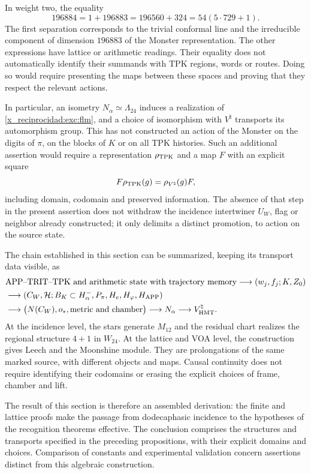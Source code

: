 In weight two, the equality
\[
 196884=1+196883=196560+324=54(5\cdot729+1).
\]
The first separation corresponds to the trivial conformal line and the
irreducible component of dimension $196883$ of the Monster
representation. The other expressions have lattice or
arithmetic readings. Their equality does not automatically identify their summands
with TPK regions, words or routes. Doing so would require
presenting the maps between these spaces and proving that they respect the
relevant actions.

In particular, an isometry $N_\alpha\simeq\Lambda_{24}$ induces
a realization of \eqref{x_reciprocidad:exc:flm}, and a choice of isomorphism
with $V^\natural$ transports its automorphism group. This has not
constructed an action of the Monster on the digits of
$\pi$, on the blocks of $K$ or on all TPK histories.
Such an additional assertion would require a representation
$\rho_{\rm TPK}$ and a map $F$ with an explicit square
\[
 F\rho_{\rm TPK}(g)=\rho_{V^\natural}(g)F,
\]
including domain, codomain and preserved information. The absence
of that step in the present assertion does not withdraw the incidence
intertwiner $U_W$, flag or neighbor already constructed; it only
delimits a distinct promotion, to action on the source state.

The chain established in this section can be summarized, keeping
its transport data visible, as
\begin{align*}
 &\text{APP--TRIT--TPK and arithmetic state with trajectory memory}
   \longrightarrow (w_j,f_j;K,Z_0)\\
 &\longrightarrow (C_W,\mathcal H;B_K\subset H^-_\alpha,
                   P_\pi,H_e,H_\varphi,H_{\rm APP})\\
 &\longrightarrow \bigl(N(C_W),o_*,\text{metric and chamber}\bigr)
   \longrightarrow N_\alpha
   \longrightarrow V^\natural_{\rm HMT}.
\end{align*}
At the incidence level, the stars generate $M_{12}$ and the
residual chart realizes the regional structure $4+1$ in $W_{24}$.
At the lattice and VOA level, the construction gives Leech and the
Moonshine module. They are prolongations of the same marked source, with
different objects and maps. Causal continuity does not require
identifying their codomains or erasing the explicit choices
of frame, chamber and lift.

The result of this section is therefore an assembled derivation:
the finite and lattice proofs make the passage from dodecaphasic
incidence to the hypotheses of the recognition theorems effective.
The conclusion comprises the structures and transports specified in the
preceding propositions, with their explicit domains and choices.
Comparison of constants and experimental validation concern assertions
distinct from this algebraic construction.
